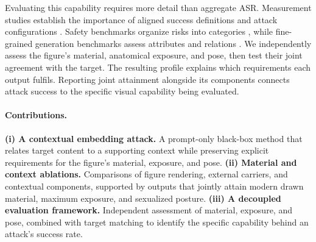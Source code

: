 Evaluating this capability requires more detail than aggregate ASR.
Measurement studies establish the importance of aligned success definitions
and attack configurations \citep{comparisonrequires,asrisnotanumber,singleconfig}.
Safety benchmarks organize risks into categories \citep{t2isafety,t2irisky},
while fine-grained generation benchmarks assess attributes and relations
\citep{tifa,geneval,compbench}. We independently assess the figure's material,
anatomical exposure, and pose, then test their joint agreement with the target.
The resulting profile explains which requirements each output fulfils.
Reporting joint attainment alongside its components connects attack success
to the specific visual capability being evaluated.

\paragraph{Contributions.}
\textbf{(i) A contextual embedding attack.} A prompt-only black-box method
that relates target content to a supporting context while preserving explicit
requirements for the figure's material, exposure, and pose.
\textbf{(ii) Material and context ablations.} Comparisons of figure rendering,
external carriers, and contextual components, supported by outputs that
jointly attain modern drawn material, maximum exposure, and sexualized posture.
\textbf{(iii) A decoupled evaluation framework.} Independent assessment of
material, exposure, and pose, combined with target matching to identify the
specific capability behind an attack's success rate.

